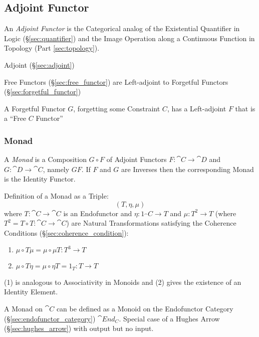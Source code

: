 \subsection{Adjoint Functor}\label{sec:adjoint_functor}

An \emph{Adjoint Functor} is the Categorical analog of the Existential
Quantifier in Logic (\S\ref{sec:quantifier}) and the Image Operation
along a Continuous Function in Topology (Part \ref{sec:topology}).

Adjoint (\S\ref{sec:adjoint})

Free Functors (\S\ref{sec:free_functor}) are Left-adjoint to Forgetful
Functors (\S\ref{sec:forgetful_functor})

A Forgetful Functor $G$, forgetting some Constraint $C$, has a
Left-adjoint $F$ that is a ``Free $C$ Functor'' %



\subsubsection{Monad}\label{sec:monad}

A \emph{Monad} is a Composition $G \circ F$ of Adjoint Functors $F :
\cat{C} \rightarrow \cat{D}$ and $G : \cat{D} \rightarrow
\cat{C}$, namely $G F$. If $F$ and $G$ are Inverses then the
corresponding Monad is the Identity Functor.

Definition of a Monad as a Triple:
\[
  (T, \eta, \mu)
\]
where $T : \cat{C} \rightarrow \cat{C}$ is an Endofunctor and
$\eta : 1_\cat{C} \rightarrow T$ and $\mu : T^2 \rightarrow T$
(where $T^2 = T \circ T : \cat{C} \rightarrow \cat{C}$) are
Natural Transformations satisfying the Coherence Conditions
(\S\ref{sec:coherence_condition}):
\begin{enumerate}
  \item $\mu \circ T\mu = \mu \circ \mu T : T^3 \rightarrow T$
  \item $\mu \circ T\eta = \mu \circ \eta T = 1_T : T \rightarrow T$
\end{enumerate}
(1) is analogous to Associativity in Monoids and (2) gives the
existence of an Identity Element.

A Monad on $\cat{C}$ can be defined as a Monoid on the Endofunctor
Category (\S\ref{sec:endofunctor_category}) $\cat{End_C}$. Special
case of a Hughes Arrow (\S\ref{sec:hughes_arrow}) with output but no
input.

